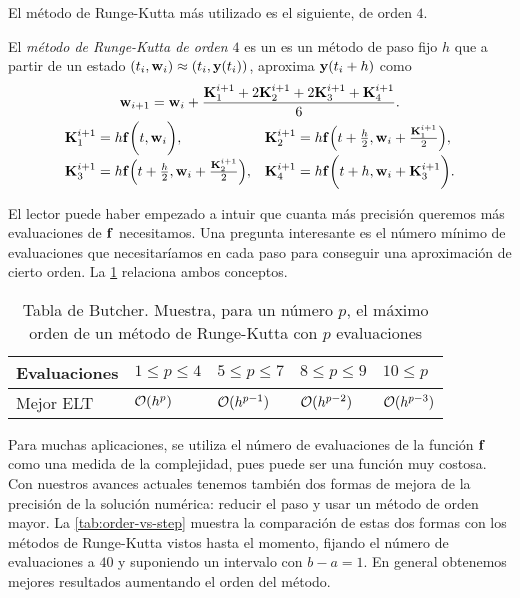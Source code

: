 El método de Runge-Kutta más utilizado es el siguiente, de orden $4$.

\begin{method}\label{met:rk4}
    \newcommand{\K}{\vb{K}}

    El \emph{método de Runge-Kutta de orden $4$}
    es un es un método de paso fijo $h$ que
    a partir de un estado $(t_i, \vb{w}{}_i) \approx (t_i, \vb{y}{}(t_i))$,
    aproxima $\vb{y}{}(t_i + h)$ como
    \begin{gather*}
        \vw_{i+1} = \vw_i + \frac{
            \K_1^{i+1} + 2\K_2^{i+1} + 2\K_3^{i+1} + \K_4^{i+1}
        }{6}. \\
        \begin{array}{ll}
        \K_1^{i+1} = h\vf\qty\bigg(t, \vw_i), &
        \K_2^{i+1} = h\vf\qty(t + \frac{h}{2}, \vw_i+ \frac{\K_1^{i+1}}{2}), \\
        \K_3^{i+1} = h\vf\qty(t + \frac{h}{2}, \vw_i+ \frac{\K_2^{i+1}}{2}), &
        \K_4^{i+1} = h\vf\qty\bigg(t + h, \vw_i + \K_3^{i+1}).
        \end{array}
    \end{gather*}
\end{method}

El lector puede haber empezado a intuir que cuanta más precisión queremos
más evaluaciones de $\vb{f}{}$ necesitamos.
Una pregunta interesante es
el número mínimo de evaluaciones que necesitaríamos en cada paso
para conseguir una aproximación de cierto orden.
La \cref{tab:butcher} relaciona ambos conceptos.

\begin{table}[H]
    \centering
    \begin{tabular}{|l||l|l|l|l|}
        \hline
        Evaluaciones & $1\le p\le 4$ & $5\le p\le 7$ & $8\le p\le 9$
            & $10\le p$ \\
        \hline
        Mejor ELT & $\vb{\mathcal{O}}{}(h^p)$ & $\vb{\mathcal{O}}{}(h^{p-1})$ & $\vb{\mathcal{O}}{}(h^{p-2})$
            & $\vb{\mathcal{O}}{}(h^{p-3})$ \\
        \hline
    \end{tabular}
    \caption{Tabla de Butcher.
        Muestra, para un número $p$,
        el máximo orden de un método de Runge-Kutta con $p$ evaluaciones}
    \label{tab:butcher}
\end{table}

Para muchas aplicaciones,
se utiliza el número de evaluaciones de la función $\vb{f}{}$
como una medida de la complejidad,
pues puede ser una función muy costosa.
Con nuestros avances actuales tenemos también dos formas de mejora
de la precisión de la solución numérica:
reducir el paso
y usar un método de orden mayor.
La \cref{tab:order-vs-step} muestra la comparación de estas dos formas
con los métodos de Runge-Kutta vistos hasta el momento,
fijando el número de evaluaciones a $40$
y suponiendo un intervalo con $b - a = 1$.
En general obtenemos mejores resultados aumentando el orden del método.

